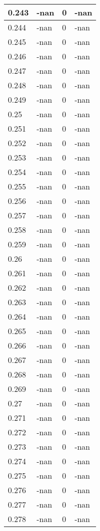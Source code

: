 \documentclass[a4paper,14pt]{extarticle}
\begin{document}
\begin{longtable}{||m{3cm}||m{3cm}|m{3cm}||m{3cm}||}
\hline
0.243 & -nan & 0 & -nan\\
\hline
0.244 & -nan & 0 & -nan\\
\hline
0.245 & -nan & 0 & -nan\\
\hline
0.246 & -nan & 0 & -nan\\
\hline
0.247 & -nan & 0 & -nan\\
\hline
0.248 & -nan & 0 & -nan\\
\hline
0.249 & -nan & 0 & -nan\\
\hline
0.25 & -nan & 0 & -nan\\
\hline
0.251 & -nan & 0 & -nan\\
\hline
0.252 & -nan & 0 & -nan\\
\hline
0.253 & -nan & 0 & -nan\\
\hline
0.254 & -nan & 0 & -nan\\
\hline
0.255 & -nan & 0 & -nan\\
\hline
0.256 & -nan & 0 & -nan\\
\hline
0.257 & -nan & 0 & -nan\\
\hline
0.258 & -nan & 0 & -nan\\
\hline
0.259 & -nan & 0 & -nan\\
\hline
0.26 & -nan & 0 & -nan\\
\hline
0.261 & -nan & 0 & -nan\\
\hline
0.262 & -nan & 0 & -nan\\
\hline
0.263 & -nan & 0 & -nan\\
\hline
0.264 & -nan & 0 & -nan\\
\hline
0.265 & -nan & 0 & -nan\\
\hline
0.266 & -nan & 0 & -nan\\
\hline
0.267 & -nan & 0 & -nan\\
\hline
0.268 & -nan & 0 & -nan\\
\hline
0.269 & -nan & 0 & -nan\\
\hline
0.27 & -nan & 0 & -nan\\
\hline
0.271 & -nan & 0 & -nan\\
\hline
0.272 & -nan & 0 & -nan\\
\hline
0.273 & -nan & 0 & -nan\\
\hline
0.274 & -nan & 0 & -nan\\
\hline
0.275 & -nan & 0 & -nan\\
\hline
0.276 & -nan & 0 & -nan\\
\hline
0.277 & -nan & 0 & -nan\\
\hline
0.278 & -nan & 0 & -nan\\

\end{longtable}
\end{document}
